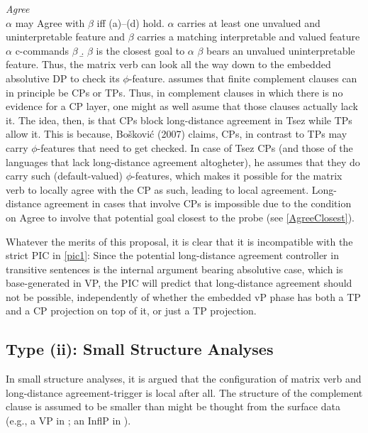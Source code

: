 \documentclass[output=paper
,modfonts
,nonflat]{langsci/langscibook}
\begin{document}
\ea\label{ex:mueller:7} \label{Agree}{\itshape Agree} \\ $\alpha$ may Agree with $\beta$ iff
(a)--(d) hold.
\ea  $\alpha$ carries at least one unvalued and uninterpretable
      feature and $\beta$ carries a matching interpretable and valued
      feature 
\ex  $\alpha$ c-commands $\beta$
    \b. \label{AgreeClosest}$\beta$ is the closest goal to $\alpha$
\ex \label{AC}$\beta$ bears an unvalued uninterpretable feature.
\z
\z
Thus, the matrix verb can look all the way
down to the embedded absolutive DP to check its
$\phi$-feature. \citet{Boskovic:07} assumes that finite complement
clauses can in principle be CPs or TPs. Thus, in complement clauses in
which there is no evidence for a CP layer, one might as well asume
that those clauses actually lack it.
The idea, then, is that CPs block long-distance agreement in Tsez while TPs allow it. This
is because, Bo\v{s}kovi{\'c} (2007) claims, CPs, in contrast to TPs
may carry $\phi$-features that need to get checked. In case of Tsez
CPs (and those of the languages that lack long-distance agreement altogheter), he assumes
that they do carry such (default-valued) $\phi$-features, which makes it possible for
the matrix verb to locally agree with the CP as such, leading to local
agreement. Long-distance agreement in cases that involve CPs is impossible due to the
condition on Agree to involve that potential goal closest to the probe
(see \ref{AgreeClosest}).

Whatever the merits of this proposal, it is clear that it is
incompatible with the strict PIC in \ref{pic1}: 
 Since the potential long-distance agreement controller  in
transitive sentences is the internal argument bearing absolutive case, which is base-generated
in VP, the PIC will predict that long-distance agreement should not be
possible, independently of whether the embedded vP phase has both a TP
and a CP projection on top of it, or just a TP projection. 

\subsection{Type (ii): Small Structure Analyses}

In small structure analyses, it is argued that the configuration of matrix verb
and long-distance agree\-ment-trigger is local after all. The structure
of the complement clause is assumed to be smaller than might be
thought from the surface data (e.g., a VP in \cite{Boeckx:04}; an
InflP in \cite{Bhatt:05}).
\end{document}

